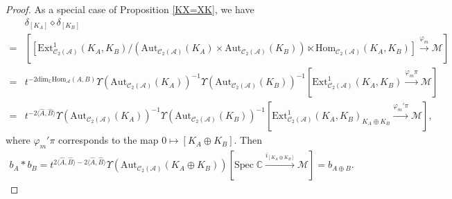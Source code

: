 \documentclass[10pt,a4paper]{amsart}
\begin{document}
\begin{proof}
  As a special case of Proposition \ref{KX=XK}, we have
  \begin{align*}
      &\delta_{[K_A]} \diamond \delta_{[K_B]} \\
      =& [[\mathrm{Ext}^1_{\mathcal{C}_2(\mathcal{A})}(K_A,K_B)/(\mathrm{Aut}_{\mathcal{C}_2(\mathcal{A})}(K_A) \times \mathrm{Aut}_{\mathcal{C}_2(\mathcal{A})}(K_B)) \ltimes \mathrm{Hom}_{\mathcal{C}_2(\mathcal{A})}(K_A, K_B)] \xrightarrow{\varphi_m} \mathcal{M}] \\
      =& t^{-2\mathrm{dim}_{\mathbb{C}}\mathrm{Hom}_{\mathcal{A}}(A,B)} \Upsilon(\mathrm{Aut}_{\mathcal{C}_2(\mathcal{A})}(K_A))^{-1}\Upsilon(\mathrm{Aut}_{\mathcal{C}_2(\mathcal{A})}(K_B))^{-1}[\mathrm{Ext}^1_{\mathcal{C}_2(\mathcal{A})}(K_A,K_B) \xrightarrow{\varphi_m \pi} \mathcal{M}]  \\
      =& t^{-2\langle \widehat{A}, \widehat{B} \rangle}\Upsilon(\mathrm{Aut}_{\mathcal{C}_2(\mathcal{A})}(K_A))^{-1}\Upsilon(\mathrm{Aut}_{\mathcal{C}_2(\mathcal{A})}(K_B))^{-1} [\mathrm{Ext}^1_{\mathcal{C}_2(\mathcal{A})}(K_A,K_B)_{K_A \oplus K_B} \xrightarrow{\varphi_m' \pi} \mathcal{M}], 
  \end{align*}
  where $ \varphi_m' \pi $ corresponds to the map $ 0 \mapsto [K_A \oplus K_B]  $. 
  Then
  \begin{align*}
      b_A * b_B = t^{2\langle \widehat{A}, \widehat{B} \rangle-2\langle \widehat{A}, \widehat{B} \rangle}\Upsilon(\mathrm{Aut}_{\mathcal{C}_2(\mathcal{A})}(K_A \oplus K_B))[\mathrm{Spec}\; \mathbb{C} \xrightarrow{i_{[K_A \oplus K_B]}} \mathcal{M}] = b_{ A\oplus B}.
  \end{align*}
\end{proof}
\end{document}
